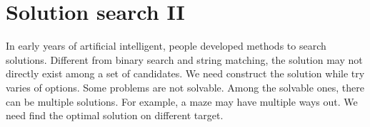 \documentclass[b5paper]{article}
\begin{document}






\chapter{Solution search II}

In early years of artificial intelligent, people developed methods to search solutions. Different from binary search and string matching, the solution may not directly exist among a set of candidates. We need construct the solution while try varies of options. Some problems are not solvable. Among the solvable ones, there can be multiple solutions. For example, a maze may have multiple ways out. We need find the optimal solution on different target.
\end{document}
